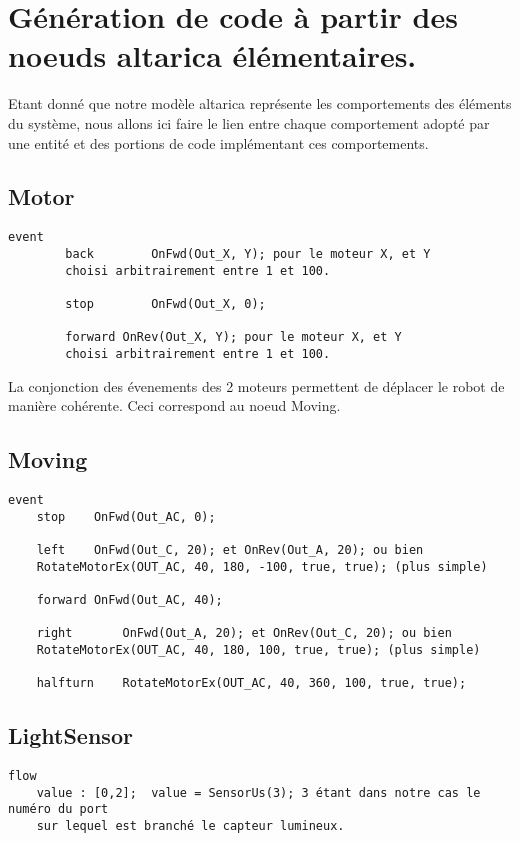 \section{Génération de code à partir des noeuds altarica élémentaires.}

Etant donné que notre modèle altarica représente les comportements des éléments du système, nous allons ici faire le lien entre chaque comportement adopté par une entité et des portions de code implémentant ces comportements.

\subsection{Motor}

\begin{verbatim}
event
    	back		OnFwd(Out_X, Y); pour le moteur X, et Y 
    	choisi arbitrairement entre 1 et 100.
    	
    	stop		OnFwd(Out_X, 0);
    	
    	forward	OnRev(Out_X, Y); pour le moteur X, et Y 
    	choisi arbitrairement entre 1 et 100.

\end{verbatim}

La conjonction des évenements des 2 moteurs permettent de déplacer le robot de manière cohérente. Ceci correspond au noeud Moving.

\subsection{Moving}

\begin{verbatim}
event
	stop	OnFwd(Out_AC, 0);
	
	left	OnFwd(Out_C, 20); et OnRev(Out_A, 20); ou bien 
	RotateMotorEx(OUT_AC, 40, 180, -100, true, true); (plus simple)
	
	forward	OnFwd(Out_AC, 40);
	
	right		OnFwd(Out_A, 20); et OnRev(Out_C, 20); ou bien 
	RotateMotorEx(OUT_AC, 40, 180, 100, true, true); (plus simple)
	
	halfturn	RotateMotorEx(OUT_AC, 40, 360, 100, true, true);
\end{verbatim}

\subsection{LightSensor}

\begin{verbatim}
flow
    value : [0,2];	value = SensorUs(3); 3 étant dans notre cas le numéro du port 
    sur lequel est branché le capteur lumineux.
\end{verbatim}

